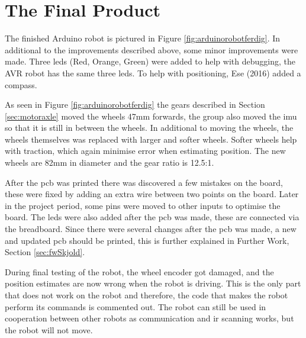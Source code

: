 \section{The Final Product}
The finished Arduino robot is pictured in Figure \ref{fig:arduinorobotferdig}. In additional to the improvements described above, some minor improvements were made. Three \acrshort{led}s (Red, Orange, Green) were added to help with debugging, the AVR robot has the same three \acrshort{led}s. To help with positioning, Ese (2016) added a compass.

As seen in Figure \ref{fig:arduinorobotferdig} the gears described in Section \ref{sec:motoraxle} moved the wheels 47mm forwards, the group also moved the \acrshort{imu} so that it is still in between the wheels. In additional to moving the wheels, the wheels themselves was replaced with larger and softer wheels. Softer wheels help with traction, which again minimise error when estimating position. The new wheels are 82mm in diameter and the gear ratio is 12.5:1.

After the \acrshort{pcb} was printed there was discovered a few mistakes on the board, these were fixed by adding an extra wire between two points on the board. Later in the project period, some pins were moved to other inputs to optimise the board. The \acrshort{led}s were also added after the \acrshort{pcb} was made, these are connected via the breadboard. Since there were several changes after the \acrshort{pcb} was made, a new and updated \acrshort{pcb} should be printed, this is further explained in Further Work, Section \ref{sec:fwSkjold}.

During final testing of the robot, the wheel encoder got damaged, and the position estimates are now wrong when the robot is driving. This is the only part that does not work on the robot and therefore, the code that makes the robot perform its commands is commented out. The robot can still be used in cooperation between other robots as communication and \acrshort{ir} scanning works, but the robot will not move.
\vspace*{20pt}
